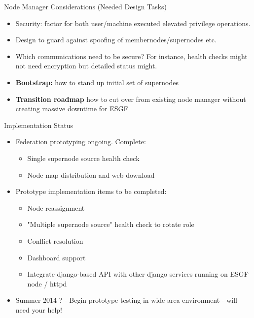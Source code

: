 \documentclass{beamer}
\begin{document}
\begin{frame}{Node Manager Considerations (Needed Design Tasks)}
\begin{itemize}
\item Security: factor for both user/machine executed elevated privilege operations.
\item Design to guard against spoofing of membernodes/supernodes etc.
\item
 Which communications need to be secure? For instance, health checks might not need encryption but detailed status might.

\item 
\textbf{Bootstrap:} how to stand up initial set of supernodes
\item
\textbf{Transition roadmap} how to cut over from existing node manager without creating massive downtime for ESGF


\end{itemize}
\end{frame}


\begin{frame}{Implementation Status}

\begin{itemize}
\item
Federation prototyping ongoing.   Complete:
\begin{itemize}
\item
Single supernode source health check 
\item
Node map distribution and web download
\end{itemize}

\item
 Prototype implementation items to be completed:
 \begin{itemize}
 \item
  Node reassignment
\item
"Multiple supernode source" health check to rotate role
\item
Conflict resolution
\item
Dashboard support
\item
Integrate django-based API with other django services running on ESGF node / httpd
 \end{itemize}
 \item
Summer 2014 ?  - Begin prototype testing in wide-area environment - will need your help!
\end{itemize}
\end{frame}
\end{document}
